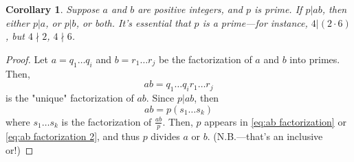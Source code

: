 \documentclass[10pt]{article}
\newtheorem{corollary}{Corollary}[theorem]
\theoremstyle{definition}
\begin{document}
\begin{corollary}
Suppose $a$ and $b$ are positive integers, and $p$ is prime.  If $p|ab$, then either $p|a$, or $p|b$, or both.  It's essential that $p$ is a prime---for instance, $4|(2\cdot 6)$, but $4\nmid 2$, $4\nmid 6$.  
\end{corollary}
\begin{proof}
Let $a=q_1\ldots q_i$ and $b=r_1\ldots r_j$ be the factorization of $a$ and $b$ into primes.  Then, 
\begin{equation}\label{eq:ab factorization}
ab = q_1\ldots q_i r_1\ldots r_j
\end{equation}
is the "unique" factorization of $ab$.  Since $p|ab$, then 
\begin{equation} \label{eq:ab factorization 2}
ab=p(s_1\ldots s_k) 
\end{equation}
where $s_1\ldots s_k$ is the factorization of $\frac{ab}{p}$.  Then, $p$ appears in \ref{eq:ab factorization} or \ref{eq:ab factorization 2}, and thus $p$ divides $a$ or $b$. (N.B.---that's an inclusive or!)
\end{proof}
\end{document}
